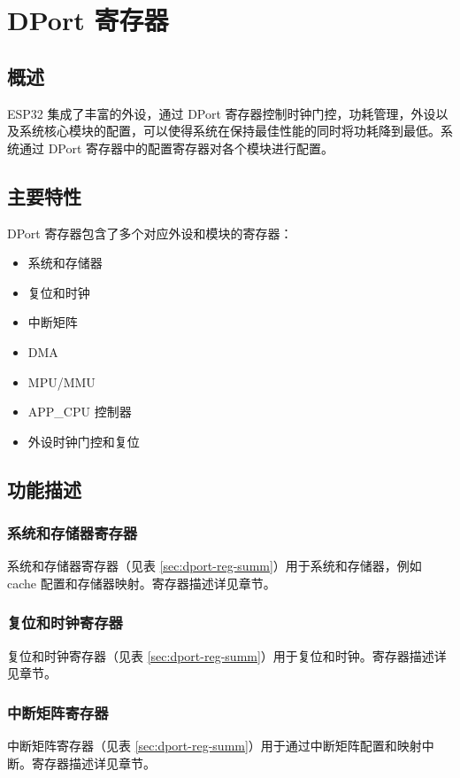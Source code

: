 \documentclass[main\_\_CN.tex]{subfiles}
\begin{document}
\hypertarget{dportreg}{}
\chapter{DPort 寄存器}
\label{mod:dportreg}

\section{概述}

ESP32 集成了丰富的外设，通过 DPort 寄存器控制时钟门控，功耗管理，外设以及系统核心模块的配置，可以使得系统在保持最佳性能的同时将功耗降到最低。系统通过 DPort 寄存器中的配置寄存器对各个模块进行配置。

\section{主要特性}
DPort 寄存器包含了多个对应外设和模块的寄存器：

\begin{itemize}
    \item 系统和存储器
    \item 复位和时钟
    \item 中断矩阵
    \item DMA
    \item MPU/MMU
    \item APP\_CPU 控制器
    \item 外设时钟门控和复位
\end{itemize}

\section{功能描述}

\subsection{系统和存储器寄存器}
系统和存储器寄存器（见表 \ref{sec:dport-reg-summ}）用于系统和存储器，例如 cache 配置和存储器映射。寄存器描述详见章节\textit{}。


\subsection{复位和时钟寄存器}
复位和时钟寄存器（见表 \ref{sec:dport-reg-summ}）用于复位和时钟。寄存器描述详见章节\textit{}。


\subsection{中断矩阵寄存器}
中断矩阵寄存器（见表 \ref{sec:dport-reg-summ}）用于通过中断矩阵配置和映射中断。寄存器描述详见章节\textit{}。
\end{document}
